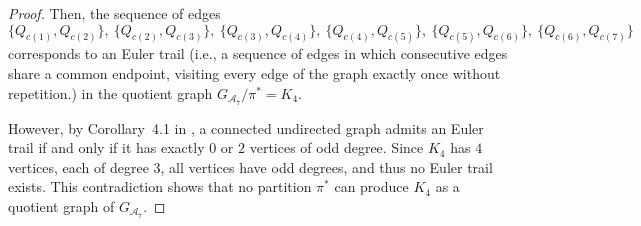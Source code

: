 \documentclass[twoside,11pt]{article}
\newcommand{\Lin}[1]{{\color{purple}{Lin: #1}}}
\def\Einsum{\textsc{Einsum}}
\newcommand{\libref}[2]{\href{#2}{\texttt{#1}}}
\newcommand{\completegraphp}[1]{K_{#1}}
\newcommand{\graphform}[1]{G_{#1}}
\def\calA{\mathcal{A}}
\def\calH{\mathcal{H}}
\def\package{\libref{u-stats}{https://github.com/zrq1706/U-Statistics-python}}
\begin{document}
\begin{proof}
Then, the sequence of edges
\begin{equation*}
\{ Q_{c(1)}, Q_{c(2)} \}, \ 
\{ Q_{c(2)}, Q_{c(3)} \}, \ 
\{ Q_{c(3)}, Q_{c(4)} \}, \ 
\{ Q_{c(4)}, Q_{c(5)} \}, \ 
\{ Q_{c(5)}, Q_{c(6)} \}, \ 
\{ Q_{c(6)}, Q_{c(7)} \}
\end{equation*}
corresponds to an Euler trail (i.e., a sequence of edges in which consecutive edges share a common endpoint, visiting every edge of the graph exactly once without repetition.) in the quotient graph $\graphform{\calA_7} / \pi^* = \completegraphp{4}$.

However, by Corollary~4.1 in \citet{bondy1976graph},  
a connected undirected graph admits an Euler trail if and only if it has exactly $0$ or $2$ vertices of odd degree.  
Since $\completegraphp{4}$ has $4$ vertices, each of degree $3$, all vertices have odd degrees, and thus no Euler trail exists.  
This contradiction shows that no partition $\pi^*$ can produce $\completegraphp{4}$ as a quotient graph of $\graphform{\calA_7}$.
\end{proof}




\end{document}
